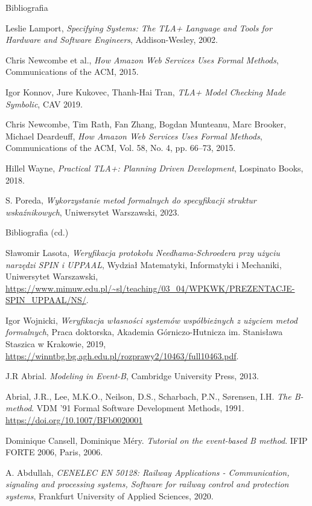 \documentclass{beamer}
\begin{document}
\begin{frame}{Bibliografia}
  \scriptsize
  \begin{thebibliography}{9}
    Leslie Lamport, \emph{Specifying Systems: The TLA+ Language and Tools for Hardware and Software Engineers}, Addison-Wesley, 2002.
  
    Chris Newcombe et al., \emph{How Amazon Web Services Uses Formal Methods}, Communications of the ACM, 2015.
  
    Igor Konnov, Jure Kukovec, Thanh-Hai Tran, \emph{TLA+ Model Checking Made Symbolic}, CAV 2019.
    
    Chris Newcombe, Tim Rath, Fan Zhang, Bogdan Munteanu, Marc Brooker, Michael Deardeuff, \emph{How Amazon Web Services Uses Formal Methods}, Communications of the ACM, Vol. 58, No. 4, pp. 66--73, 2015.

    Hillel Wayne, \emph{Practical TLA+: Planning Driven Development}, Lospinato Books, 2018.
    
    S. Poreda,
    \textit{Wykorzystanie metod formalnych do specyfikacji struktur wskaźnikowych},
    Uniwersytet Warszawski, 2023.
  \end{thebibliography}
\end{frame}

\begin{frame}{Bibliografia (cd.)}
  \scriptsize
  \begin{thebibliography}{9}
    Sławomir Lasota,
    \textit{Weryfikacja protokołu Needhama-Schroedera przy użyciu narzędzi SPIN i UPPAAL},
    Wydział Matematyki, Informatyki i Mechaniki, Uniwersytet Warszawski,
    \url{https://www.mimuw.edu.pl/~sl/teaching/03_04/WPKWK/PREZENTACJE-SPIN_UPPAAL/NS/}.

    Igor Wojnicki,
    \textit{Weryfikacja własności systemów współbieżnych z użyciem metod formalnych},
    Praca doktorska, Akademia Górniczo-Hutnicza im. Stanisława Staszica w Krakowie, 2019,
    \url{https://winntbg.bg.agh.edu.pl/rozprawy2/10463/full10463.pdf}.

    J.R Abrial. \emph{Modeling in Event-B}, Cambridge University Press, 2013.

    Abrial, J.R., Lee, M.K.O., Neilson, D.S., Scharbach, P.N., Sørensen, I.H. \emph{The B-method}. VDM '91 Formal Software Development Methods, 1991. \url{https://doi.org/10.1007/BFb0020001}

    Dominique Cansell, Dominique Méry. \emph{Tutorial on the event-based B method}. IFIP FORTE 2006, Paris, 2006.

    A. Abdullah, \emph{CENELEC EN 50128: Railway Applications - Communication, signaling and processing systems, Software for railway control and protection systems}, Frankfurt University of Applied Sciences, 2020.
  \end{thebibliography}
\end{frame}
\end{document}
